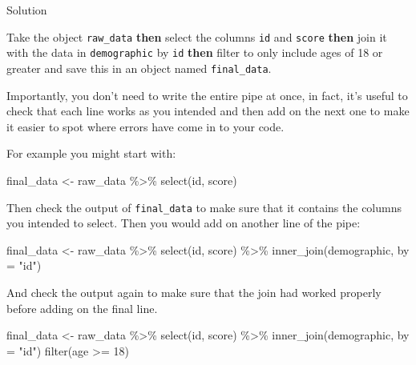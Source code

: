 \documentclass[
  oneside]{book}
\newenvironment{Shaded}{\begin{snugshade}}{\end{snugshade}}
\newcommand{\AttributeTok}[1]{\textcolor[rgb]{0.77,0.63,0.00}{#1}}
\newcommand{\DecValTok}[1]{\textcolor[rgb]{0.00,0.00,0.81}{#1}}
\newcommand{\FunctionTok}[1]{\textcolor[rgb]{0.00,0.00,0.00}{#1}}
\newcommand{\NormalTok}[1]{#1}
\newcommand{\OtherTok}[1]{\textcolor[rgb]{0.56,0.35,0.01}{#1}}
\newcommand{\SpecialCharTok}[1]{\textcolor[rgb]{0.00,0.00,0.00}{#1}}
\newcommand{\StringTok}[1]{\textcolor[rgb]{0.31,0.60,0.02}{#1}}
\begin{document}
Solution

Take the object \texttt{raw\_data} \textbf{then} select the columns \texttt{id} and \texttt{score} \textbf{then} join it with the data in \texttt{demographic} by \texttt{id} \textbf{then} filter to only include ages of 18 or greater and save this in an object named \texttt{final\_data}.

Importantly, you don't need to write the entire pipe at once, in fact, it's useful to check that each line works as you intended and then add on the next one to make it easier to spot where errors have come in to your code.

For example you might start with:

\begin{Shaded}
\begin{Highlighting}[]
\NormalTok{final\_data }\OtherTok{\textless{}{-}}\NormalTok{ raw\_data }\SpecialCharTok{\%\textgreater{}\%}
  \FunctionTok{select}\NormalTok{(id, score)}
\end{Highlighting}
\end{Shaded}

Then check the output of \texttt{final\_data} to make sure that it contains the columns you intended to select. Then you would add on another line of the pipe:

\begin{Shaded}
\begin{Highlighting}[]
\NormalTok{final\_data }\OtherTok{\textless{}{-}}\NormalTok{ raw\_data }\SpecialCharTok{\%\textgreater{}\%}
  \FunctionTok{select}\NormalTok{(id, score) }\SpecialCharTok{\%\textgreater{}\%}
  \FunctionTok{inner\_join}\NormalTok{(demographic, }\AttributeTok{by =} \StringTok{"id"}\NormalTok{)}
\end{Highlighting}
\end{Shaded}

And check the output again to make sure that the join had worked properly before adding on the final line.

\begin{Shaded}
\begin{Highlighting}[]
\NormalTok{final\_data }\OtherTok{\textless{}{-}}\NormalTok{ raw\_data }\SpecialCharTok{\%\textgreater{}\%}
  \FunctionTok{select}\NormalTok{(id, score) }\SpecialCharTok{\%\textgreater{}\%}
  \FunctionTok{inner\_join}\NormalTok{(demographic, }\AttributeTok{by =} \StringTok{"id"}\NormalTok{)}
  \FunctionTok{filter}\NormalTok{(age }\SpecialCharTok{\textgreater{}=} \DecValTok{18}\NormalTok{) }
\end{Highlighting}
\end{Shaded}
\end{document}
